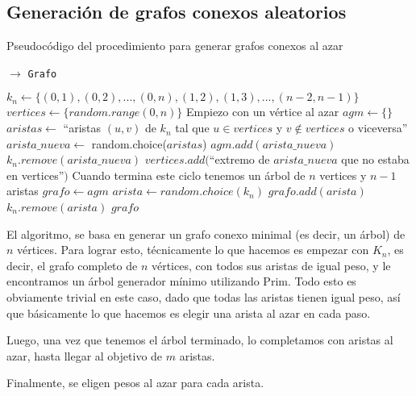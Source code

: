 
\subsection{Generación de grafos conexos aleatorios}
\label{subsec:grafos-aleatorios}

\begin{algorithm}[H]
  \begin{algorithmic}[1]
  \caption{Pseudocódigo del procedimiento para generar grafos conexos al azar}
  \label{algo:ap-1}
    $\rightarrow$ \texttt{Grafo}

    	\State $k_n \gets \{(0,1), (0,2), ..., (0,n), (1,2), (1,3), ..., (n-2, n-1)\}$
      \State $vertices \gets \{random.range(0, n)\}$ \Comment Empiezo con un vértice al azar
      \State $agm \gets \{\}$
         \State $aristas \gets$ ``aristas $(u,v)$ de $k_n$ tal que $u \in vertices$ y $v \not\in vertices$ o viceversa''
         \State $arista\_nueva \gets$ random.choice($aristas$)
         \State $agm.add(arista\_nueva)$
         \State $k_n.remove(arista\_nueva)$
         \State $vertices.add($``extremo de $arista\_nueva$ que no estaba en vertices''$)$
      \EndWhile
      \State \Comment Cuando termina este ciclo tenemos un árbol de $n$ vertices y $n-1$ aristas
      \State $grafo \gets agm$
         \State $arista \gets random.choice(k_n)$
         \State $grafo.add(arista)$
         \State $k_n.remove(arista)$
      \EndWhile
      \EndFor
      \Return $grafo$
		\EndProcedure
	\end{algorithmic}
\end{algorithm}


El algoritmo, se basa en generar un grafo conexo minimal (es decir, un árbol) de $n$ vértices.
Para lograr esto, técnicamente lo que hacemos es empezar con $K_n$, es decir, el grafo completo de $n$ vértices, con todos sus aristas de igual peso, y le encontramos un árbol generador mínimo utilizando Prim. Todo esto es obviamente trivial en este caso, dado que todas las aristas tienen igual peso, así que básicamente lo que hacemos es elegir una arista al azar en cada paso.

Luego, una vez que tenemos el árbol terminado, lo completamos con aristas al azar, hasta llegar al objetivo de $m$ aristas. 

Finalmente, se eligen pesos al azar para cada arista.


